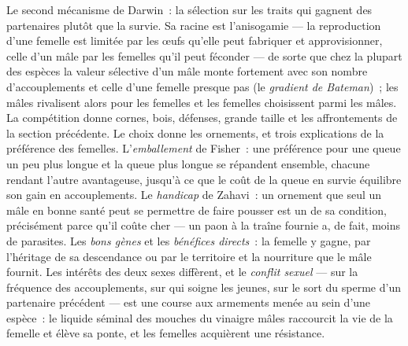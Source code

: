 \begin{definition}\label{def:b3:behavioural-ecology:sexual-selection}
Le second mécanisme de Darwin~: la sélection sur les traits qui gagnent
des partenaires plutôt que la survie. Sa racine est l'anisogamie --- la
reproduction d'une femelle est limitée par les œufs qu'elle peut
fabriquer et approvisionner, celle d'un mâle par les femelles qu'il peut
féconder --- de sorte que chez la plupart des espèces la valeur
sélective d'un mâle monte fortement avec son nombre d'accouplements et
celle d'une femelle presque pas (le \emph{gradient de Bateman})~; les
mâles rivalisent alors pour les femelles et les femelles choisissent
parmi les mâles. La compétition donne cornes, bois, défenses, grande
taille et les affrontements de la section précédente. Le choix donne les
ornements, et trois explications de la préférence des femelles.
L'\emph{emballement} de Fisher~: une préférence pour une queue un peu
plus longue et la queue plus longue se répandent ensemble, chacune
rendant l'autre avantageuse, jusqu'à ce que le coût de la queue en
survie équilibre son gain en accouplements. Le \emph{handicap} de
Zahavi~: un ornement que seul un mâle en bonne santé peut se permettre
de faire pousser est un  de sa condition, précisément
parce qu'il coûte cher --- un paon à la traîne fournie a, de fait, moins
de parasites. Les \emph{bons gènes} et les \emph{bénéfices directs}~: la
femelle y gagne, par l'héritage de sa descendance ou par le territoire
et la nourriture que le mâle fournit. Les intérêts des deux sexes
diffèrent, et le \emph{conflit sexuel} --- sur la fréquence des
accouplements, sur qui soigne les jeunes, sur le sort du sperme d'un
partenaire précédent --- est une course aux armements menée au sein
d'une espèce~: le liquide séminal des mouches du vinaigre mâles
raccourcit la vie de la femelle et élève sa ponte, et les femelles
acquièrent une résistance.
\end{definition}

